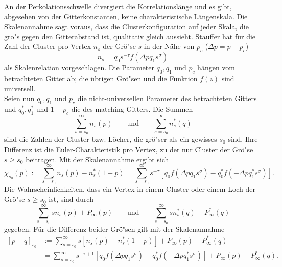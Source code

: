 An der Perkolationsschwelle divergiert die Korrelationsl\"ange und es gibt, abgesehen von der Gitterkonstanten, keine charakteristische L\"angenskala. Die Skalenannahme sagt voraus, dass die Clusterkonfiguration auf jeder Skala, die gro"s gegen den Gitterabstand ist, qualitativ gleich aussieht. Stauffer \cite{Stauffer:95} hat f\"ur die Zahl der Cluster pro Vertex $n_s$ der Gr\"o"se $s$ in der N\"ahe von $p_c$ ($\Delta p=p-p_c$)
\begin{equation}
  \label{eq:skalenann}
   n_s=q_0 s^{-\tau}f(\Delta pq_1s^{\sigma})
\end{equation}
als Skalenrelation vorgeschlagen. Die Parameter $q_0,q_1$ und $p_c$ h\"angen vom betrachteten Gitter ab; die \"ubrigen Gr\"o"sen und die Funktion $f(z)$ sind universell.\\
Seien nun $q_0,q_1$ und $p_c$ die nicht-universellen Parameter des betrachteten Gitters und $q_0^*,q_1^*$ und $1-p_c$ die des matching Gitters. Die Summen
\begin{equation}
  \sum_{s=s_0}^{\infty}n_s(p) \qquad \text{und} \qquad \sum_{s=s_0}^{\infty}n_s^*(q)
\end{equation}
sind die Zahlen der Cluster bzw. L\"ocher, die gr\"o"ser als ein gewisses $s_0$ sind. Ihre Differenz ist die Euler-Charakteristik pro Vertex, zu der nur Cluster der Gr\"o"se $s\geq s_0$ beitragen. Mit der Skalenannahme ergibt sich
\begin{equation}
   \chi_{s_0}(p):=\sum_{s=s_0}^{\infty}n_s(p)-n_s^*(1-p)=\sum_{s=s_0}^{\infty}s^{-\tau}\left[ q_0f(\Delta pq_1s^{\sigma})-q_0^*f(-\Delta pq_1^*s^{\sigma})\right].
\end{equation}
Die Wahrscheinlichkeiten, dass ein Vertex in einem Cluster oder einem Loch der Gr\"o"se $s\geq s_0$ ist, sind durch 
\begin{equation}
  \sum_{s=s_0}^{\infty}sn_s(p)+P_{\infty}(p) \qquad \text{und} \qquad \sum_{s=s_0}^{\infty}sn_s^*(q)+P_{\infty}^*(q)
\end{equation}
gegeben.
F\"ur die Differenz beider Gr\"o"sen gilt mit der Skalenannahme
\begin{equation}
\begin{split}
   [p-q]_{s_0}& :=\sum_{s=s_0}^{\infty}s\left[n_s(p)-n_s^*(1-p)\right]+P_{\infty}(p)-P_{\infty}^*(q) \\ & =\sum_{s=s_0}^{\infty}s^{-\tau+1}\left[ q_0f(\Delta pq_1s^{\sigma})-q_0^*f(-\Delta pq_1^*s^{\sigma})\right]+P_{\infty}(p)-P_{\infty}^*(q).
\end{split}
\end{equation}
